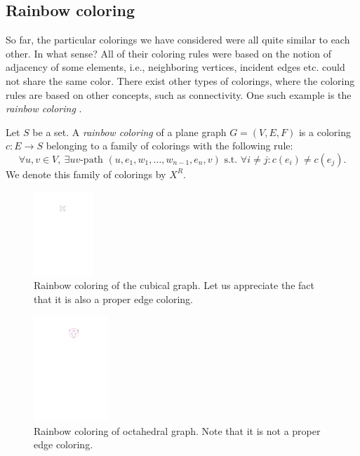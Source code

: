 \subsection{Rainbow coloring}

So far, the particular colorings we have considered were all quite similar to each other. In what sense? All of their coloring rules were based on the notion of adjacency of some elements, i.e., neighboring vertices, incident edges etc. could not share the same color. There exist other types of colorings, where the coloring rules are based on other concepts, such as connectivity. One such example is the \textit{rainbow coloring} \cite{chartrand08}.

\begin{defn}
    Let $S$ be a set. A \emph{rainbow coloring} of a plane graph $G = (V, E, F)$ is a coloring $c : E \rightarrow S$ belonging to a family of colorings with the following rule: 
    \begin{equation}\label{eqn:rainbow_rule}
     \forall u, v \in V, \ \exists uv \text{-path } (u, e_1, w_1, \ldots , w_{n-1}, e_n, v) \text{ s.t. } \forall i \neq j : c(e_i) \neq c(e_j). \tag{$R_R$}
    \end{equation}
    We denote this family of colorings by $X^R$.
\end{defn}

\begin{figure}[H]
    \centering
    \includegraphics[width=0.2\textwidth]{../Resources/Figs/cubical_edg_colr.pdf}
    \caption{Rainbow coloring of the cubical graph. Let us appreciate the fact that it is also a proper edge coloring.}
    \label{fig:cubical_rainbow_coloring}
\end{figure}

\begin{figure}[H]
    \centering
    \includegraphics[width=0.25\textwidth]{../Resources/Figs/octahedral_rainbow_colr.pdf}
    \caption{Rainbow coloring of octahedral graph. Note that it is not a proper edge coloring.}
    \label{fig:octahedral_rainbow_coloring}
\end{figure}

